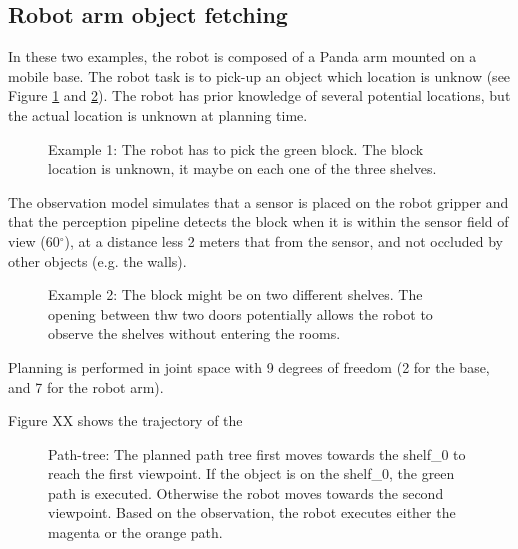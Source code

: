 \documentclass[letterpaper, 10 pt, conference]{ieeeconf}  %
\begin{document}
\subsection{Robot arm object fetching} \label{experiement:mobile_manipulation}
In these two examples, the robot is composed of a Panda arm mounted on a mobile base. The robot task is to pick-up an object which location is unknow (see Figure \ref{fig:arm_example_1} and \ref{fig:arm_example_2}). The robot has prior knowledge of several potential locations, but the actual location is unknown at planning time. 


\begin{figure}[!htb]
 \caption{Example 1: The robot has to pick the green block. The block location is unknown, it maybe on each one of the three shelves.}
 \label{fig:arm_example_1}
\end{figure}

The observation model simulates that a sensor is placed on the robot gripper and that the perception pipeline detects the block when it is within the sensor field of view (60$^{\circ}$), at a distance less 2 meters that from the sensor, and not occluded by other objects (e.g. the walls).

\begin{figure}[!htb]
 \caption{Example 2: The block might be on two different shelves. The opening between thw two doors potentially allows the robot to observe the shelves without entering the rooms.}
 \label{fig:arm_example_2}
\end{figure}

Planning is performed in joint space with 9 degrees of freedom (2 for the base, and 7 for the robot arm).

Figure XX shows the trajectory of the 

\begin{figure}[!htb]
 \caption{Path-tree: The planned path tree first moves towards the shelf\_0 to reach the first viewpoint. If the object is on the shelf\_0, the green path is executed. Otherwise the robot moves towards the second viewpoint. Based on the observation, the robot executes either the magenta or the orange path.}
 \label{fig:example_1_path_tree}
\end{figure}
\end{document}
